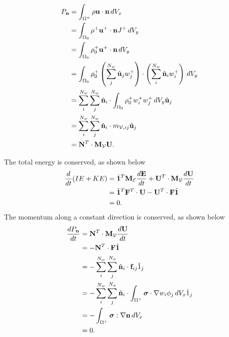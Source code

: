 \documentclass[11pt]{report}
\begin{document}
\begin{align}
    P_{\mathbf{n}} &= \int_{\Omega^+} \rho \mathbf{u} \cdot \mathbf{n} \, dV_x \nonumber \\
    &= \int_{\Omega_0} \rho^+ \mathbf{u}^+ \cdot \mathbf{n} J^+ \, dV_y \nonumber \\
    &= \int_{\Omega_0} \rho^+_0 \mathbf{u}^+ \cdot \mathbf{n} \, dV_y \nonumber \\
    &= \int_{\Omega_0} \rho^+_0 \left ( \sum_j^{N_w} \hat{\mathbf{u}}_j w^+_j \right ) \cdot \left ( \sum_i^{N_w} \hat{\mathbf{n}}_i w_i^+ \right ) \, dV_y \nonumber \\
    &= \sum_i^{N_w} \sum_j^{N_w} \hat{\mathbf{n}}_i \cdot \int_{\Omega_0} \rho_0^+ w_i^+ w_j^+ \, dV_y \hat{\mathbf{u}}_j \nonumber \\
    &= \sum_i^{N_w} \sum_j^{N_w} \hat{\mathbf{n}}_i \cdot m_{\mathcal{V},ij} \hat{\mathbf{u}}_j \nonumber \\
    &= \mathbf{N}^T \cdot \mathbf{M}_\mathcal{V} \mathbf{U}.
\end{align}

The total energy is conserved, as shown below
\begin{align}
    \frac{d}{dt} (IE + KE) &= \hat{\mathbf{1}}^T \mathbf{M}_\mathcal{E} \frac{d\mathbf{E}}{dt} + \mathbf{U}^T \cdot \mathbf{M}_\mathcal{V} \frac{d\mathbf{U}}{dt} \nonumber \\
    &= \hat{\mathbf{1}}^T \mathbf{F}^T \cdot \mathbf{U} - \mathbf{U}^T \cdot \mathbf{F} \hat{\mathbf{1}} \nonumber \\
    &= 0.
\end{align}
The momentum along a constant direction is conserved, as shown below
\begin{align}
    \frac{d P_{\mathbf{n}}}{dt} &= \mathbf{N}^T \cdot \mathbf{M}_\mathcal{V} \frac{d \mathbf{U}}{dt} \nonumber \\
    &= -\mathbf{N}^T \cdot \mathbf{F} \hat{\mathbf{1}} \nonumber \\
    &= -\sum_i^{N_w} \sum_j^{N_\phi} \hat{\mathbf{n}}_i \cdot \mathbf{f}_{ij} \hat{1}_j \nonumber \\
    &= -\sum_i^{N_w} \sum_j^{N_\phi} \hat{\mathbf{n}}_i \cdot \int_{\Omega^+} \bm \sigma \cdot \nabla w_i \phi_j \, dV_x \hat{1}_j \nonumber \\
    &= -\int_{\Omega^+} \bm \sigma : \nabla \mathbf{n} \, dV_x \nonumber \\
    &= 0.
\end{align}

\end{document}
